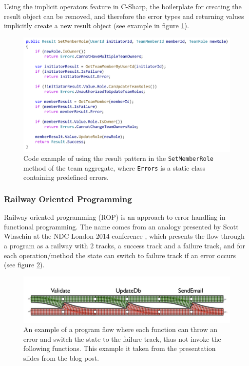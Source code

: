 Using the implicit operators feature in C-Sharp, the boilerplate for creating the result object can be removed, and therefore the error types and returning values implicitly create a new result object (see example in figure \ref{fig:set-member-role}).

\begin{figure} [H]
    \centering
    \includegraphics[width=\textwidth]{figures/set-member-role.pdf}
    \caption{Code example of using the result pattern in the \texttt{SetMemberRole} method of the team aggregate, where \texttt{Errors} is a static class containing predefined errors.}
    \label{fig:set-member-role}
\end{figure}

\subsubsection{Railway Oriented Programming}
Railway-oriented programming (ROP) is an approach to error handling in functional programming. The name comes from an analogy presented by Scott Wlaschin at the NDC London 2014 conference \cite{scott_wlaschin:rop}, which presents the flow through a program as a railway with 2 tracks, a success track and a failure track, and for each operation/method the state can switch to failure track if an error occurs (see figure \ref{fig:rop}).

\begin{figure} [H]
    \centering
    \includegraphics[width=\textwidth]{figures/rop.png}
    \caption{An example of a program flow where each function can throw an error and switch the state to the failure track, thus not invoke the following functions. This example it taken from the presentation slides from the \cite{scott_wlaschin:rop} blog post.}
    \label{fig:rop}
\end{figure}

